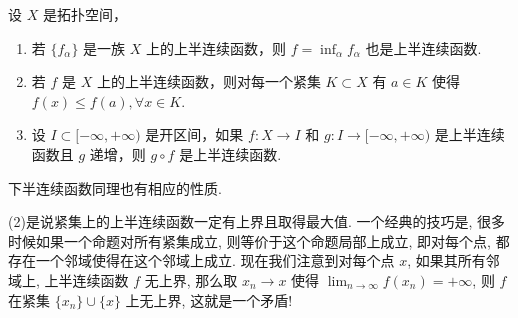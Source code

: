 \documentclass[../../main.tex]{subfiles}%
\begin{document}
\begin{proposition}[上半连续函数基本性质]\label{proposition:半连续函数基本性质}
设 \(X\) 是拓扑空间，
\begin{enumerate}[(1)]
\item 若 \(\{f_{\alpha}\}\) 是一族 \(X\) 上的上半连续函数，则 \(f = \inf_{\alpha} f_{\alpha}\) 也是上半连续函数.
\item 若 \(f\) 是 \(X\) 上的上半连续函数，则对每一个紧集 \(K \subset X\) 有 \(a \in K\) 使得 \(f(x) \leqslant  f(a),\forall x \in K\).
\item 设 \(I \subset [-\infty,+\infty)\) 是开区间，如果 \(f: X \to I\) 和 \(g: I \to [-\infty,+\infty)\) 是上半连续函数且 \(g\) 递增，则 \(g \circ f\) 是上半连续函数.
\end{enumerate}
\end{proposition}
\begin{remark}
下半连续函数同理也有相应的性质.
\end{remark}
\begin{note}
(2)是说紧集上的上半连续函数一定有上界且取得最大值. 一个经典的技巧是, 很多时候如果一个命题对所有紧集成立, 则等价于这个命题局部上成立, 即对每个点, 都存在一个邻域使得在这个邻域上成立. 现在我们注意到对每个点 \(x\), 如果其所有邻域上, 上半连续函数 \(f\) 无上界, 那么取 \(x_{n}\to x\) 使得 \(\lim_{n \to \infty}f(x_{n}) = +\infty\), 则 \(f\) 在紧集 \(\{x_{n}\}\cup\{x\}\) 上无上界, 这就是一个矛盾!
\end{note}
\end{document}
